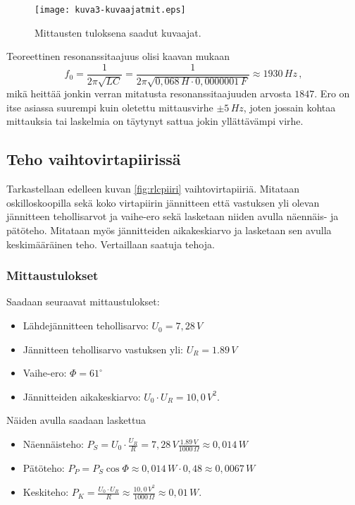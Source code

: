 \documentclass[a4paper,11pt]{article}
\begin{document}
{\begin{figure}
    \centering
    \texttt{[image: kuva3-kuvaajatmit.eps]}
    \caption{Mittausten tuloksena saadut kuvaajat.}
    \label{fig:kuvaajat}
\end{figure}

Teoreettinen resonanssitaajuus olisi kaavan mukaan
\begin{equation}
\label{resot}
    f_0=\frac{1}{2\pi\sqrt{LC}}=\frac{1}{2\pi\sqrt{0,068\,H \cdot 0,0000001\,F}} \approx 1930\,Hz\,,
\end{equation}
mikä heittää jonkin verran mitatusta resonanssitaajuuden arvosta $1847$. Ero on itse asiassa suurempi kuin oletettu mittausvirhe $\pm 5\,Hz$, joten jossain kohtaa mittauksia tai laskelmia on täytynyt sattua jokin yllättävämpi virhe.

\subsection{Teho vaihtovirtapiirissä}

Tarkastellaan edelleen kuvan \ref{fig:rlcpiiri} vaihtovirtapiiriä. Mitataan oskilloskoopilla sekä koko virtapiirin jännitteen että vastuksen yli olevan jännitteen tehollisarvot ja vaihe-ero sekä lasketaan niiden avulla näennäis- ja pätöteho. Mitataan myös jännitteiden aikakeskiarvo ja lasketaan sen avulla keskimääräinen teho. Vertaillaan saatuja tehoja.

\subsubsection{Mittaustulokset}

Saadaan seuraavat mittaustulokset:
\begin{itemize}
    \item Lähdejännitteen tehollisarvo: $U_0=7,28\,V$
    \item Jännitteen tehollisarvo vastuksen yli: $U_R=1.89\,V$
    \item Vaihe-ero: $\Phi = 61^{\circ}$
    \item Jännitteiden aikakeskiarvo: $U_0 \cdot U_R = 10,0\,V^2$.
\end{itemize}

Näiden avulla saadaan laskettua
\begin{itemize}
    \item Näennäisteho: $P_S=U_0 \cdot \frac{U_R}{R} = 7,28\,V \frac{1.89\,V}{1000\,\Omega} \approx 0,014\,W$
    \item Pätöteho: $P_P=P_S \cos{\Phi} \approx 0,014\,W \cdot 0,48 \approx 0,0067\,W$
    \item Keskiteho: $P_K = \frac{U_0 \cdot U_R}{R} \approx \frac{10,0\,V^2}{1000\,\Omega} \approx 0,01\,W$.
\end{itemize}

}
\end{document}
